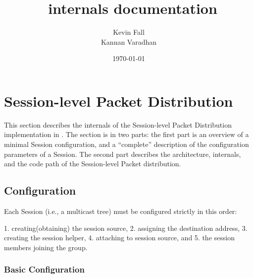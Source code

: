 \documentclass{article}
\begin{document}
\title{\nsTcl\ internals documentation}
\author{%
  Kevin Fall \\
  Kannan Varadhan }
\date{\today}

\def\c#1{\ensuremath{C_{#1}}}
\def\d#1{\ensuremath{D_{#1}}}


\section{Session-level Packet Distribution}
\label{sec:session}

This section describes the internals of the Session-level Packet Distribution
implementation in \ns.
The section is in two parts:
the first part is an overview of 
a minimal Session configuration,
and a ``complete'' description of the configuration parameters 
of a Session.
The second part describes the architecture, internals, and the code path
of the Session-level Packet distribution.

\subsection{Configuration}
\label{sec:session-config}

Each Session (i.e., a multicast tree) must be configured strictly in
this order:
 
1. creating(obtaining) the session source,
2. assigning the destination address,
3. creating the session helper, 
4. attaching to session source, and
5. the session members joining the group.


\subsubsection{Basic Configuration}
\label{sec:basic-config}
\end{document}
